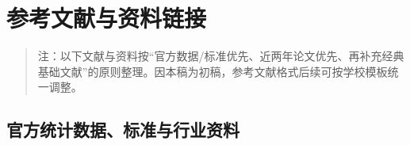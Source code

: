 \chapter*{参考文献与资料链接}
\thispagestyle{plain}

\begin{quote}
注：以下文献与资料按“官方数据/标准优先、近两年论文优先、再补充经典基础文献”的原则整理。因本稿为初稿，参考文献格式后续可按学校模板统一调整。

\end{quote}

\section{官方统计数据、标准与行业资料}

